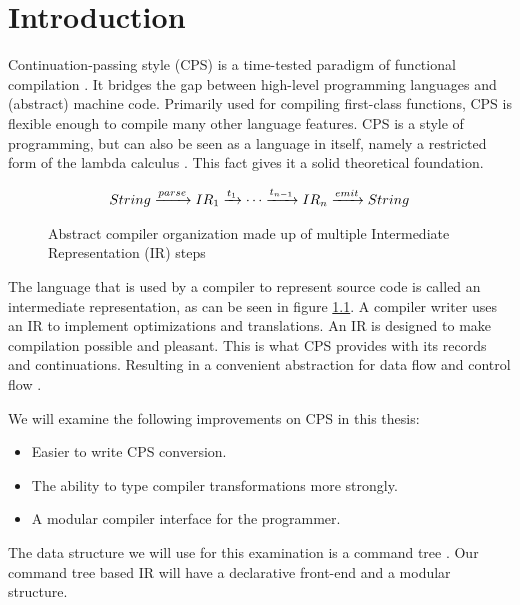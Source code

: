 
\chapter{\label{chap:introduction}Introduction}

Continuation-passing style (CPS) is a time-tested paradigm of functional compilation \autocite{steele1978rabbit, DBLP:books/daglib/0022396}. It bridges the gap between high-level programming languages and (abstract) machine code. Primarily used for compiling first-class functions, CPS is flexible enough to compile many other language features. CPS is a style of programming, but can also be seen as a language in itself, namely a restricted form of the lambda calculus \autocite{church2016calculi, barendregt1984lambda}. This fact gives it a solid theoretical foundation.

\begin{figure}
\begin{gather*}
  String \xrightarrow{parse} IR_1 \xrightarrow{t_1} \cdots \xrightarrow{t_{n-1}} IR_n \xrightarrow{emit} String
\end{gather*}
\caption{Abstract compiler organization made up of multiple Intermediate Representation (IR) steps}
\label{fig:comporg}
\end{figure}

The language that is used by a compiler to represent source code is called an intermediate representation, as can be seen in figure \ref{fig:comporg}. A compiler writer uses an IR to implement optimizations and translations. An IR is designed to make compilation possible and pleasant. This is what CPS provides with its records and continuations. Resulting in a convenient abstraction for data flow and control flow \autocite{bruin2020framevm}.

We will examine the following improvements on CPS in this thesis:

\begin{itemize}
\item Easier to write CPS conversion.
\item The ability to type compiler transformations more strongly.
\item A modular compiler interface for the programmer.
\end{itemize}

The data structure we will use for this examination is a command tree \autocite{commandtreespoulsen}. Our command tree based IR will have a declarative front-end and a modular structure.

